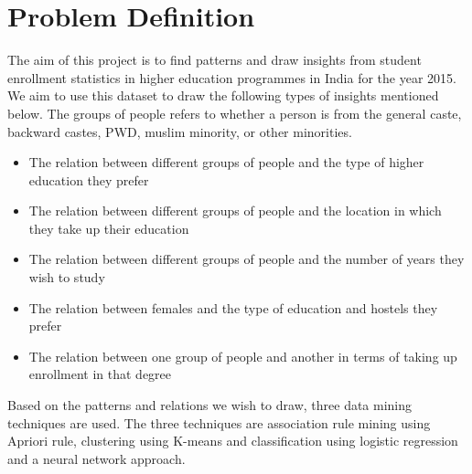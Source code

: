 \section{Problem Definition}
The aim of this project is to find patterns and draw insights from student enrollment statistics in higher education programmes in India for the year 2015. We aim to use this dataset to draw the following types of insights mentioned below. The groups of people refers to whether a person is from the general caste, backward castes, PWD, muslim minority, or other minorities.
\begin{itemize}
    \item The relation between different groups of people and the type of higher education they prefer
    \item The relation between different groups of people and the location in which they take up their education
    \item The relation between different groups of people and the number of years they wish to study
    \item The relation between females and the type of education and hostels they prefer
    \item The relation between one group of people and another in terms of taking up enrollment in that degree
\end{itemize}

Based on the patterns and relations we wish to draw, three data mining techniques are used. The three techniques are association rule mining using Apriori rule, clustering using K-means and classification using logistic regression and a neural network approach. 